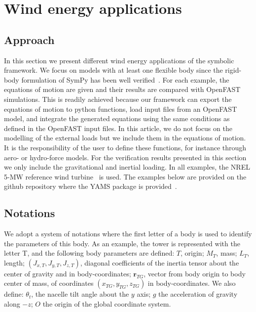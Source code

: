 \documentclass[wes, manuscript]{copernicus}
\renewcommand{\v}[1]{\boldsymbol{#1}}
\newcommand{\m}[1]{\boldsymbol{#1}}
\begin{document}




\section{Wind energy applications}
\label{sec:WEapplications}

\subsection{Approach}
In this section we present different wind energy applications of the symbolic framework. 
We focus on models with at least one flexible body since the rigid-body formulation of SymPy has been well verified~\citep{Gede:2013}.
For each example, the equations of motion are given and their results are compared with OpenFAST~\citep{openfast} simulations. This is readily achieved because our framework can export the equations of motion to python functions, load input files from an OpenFAST model, and integrate the generated equations using the same conditions as defined in the OpenFAST input files. 
In this article, we do not focus on the modelling of the external loads but we include them in the equations of motion. It is the responsibility of the user to define these functions, for instance through aero- or hydro-force models. For the verification results presented in this section we only include the gravitational and inertial loading. In all examples, the NREL 5-MW reference wind turbine~\citep{nrel5mw} is used. The examples below are provided on the github repository where the YAMS package is provided~\citep{WELIBgithub}.

\subsection{Notations}
We adopt a system of notations where the first letter of a body is used to identify the parameters of this body. As an example, the tower is represented with the letter T, and the following body parameters are defined: $T$, origin; $M_T$, mass; $L_T$, length; $(J_{x,T}, J_{y,T}, J_{z,T})$, diagonal coefficients of the inertia tensor about the center of gravity and in body-coordinates; $\v{r}_{TG}$, vector from body origin to body center of mass, of coordinates $(x_{TG},y_{TG},z_{TG})$ in body-coordinates. 
We also define: $\theta_t$, the nacelle tilt angle about the $y$ axis; $g$ the acceleration of gravity along $-z$; $O$ the origin of the global coordinate system.
\end{document}
